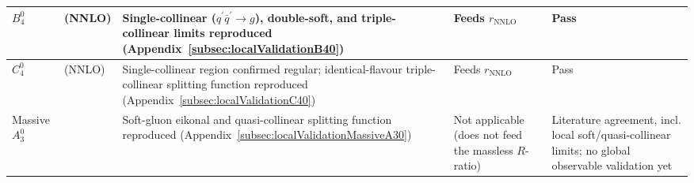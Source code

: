 \begin{center}
\begin{longtable}{|p{1.9cm}|p{2.8cm}|p{3.2cm}|p{2.4cm}|p{3.3cm}|}
$B_4^0$ & \cite{Gehrmann-DeRidder:2005btv} (NNLO) & Single-collinear ($q^\prime\bar q^\prime\to g$), double-soft, and triple-collinear limits reproduced (Appendix~\ref{subsec:localValidationB40}) & Feeds $r_\text{NNLO}$ & Pass \\ \hline
$C_4^0$ & \cite{Gehrmann-DeRidder:2005btv} (NNLO) & Single-collinear region confirmed regular; identical-flavour triple-collinear splitting function reproduced (Appendix~\ref{subsec:localValidationC40}) & Feeds $r_\text{NNLO}$ & Pass \\ \hline
Massive $A_3^0$ & \cite{GehrmannDeRidder:2009fz} & Soft-gluon eikonal and quasi-collinear splitting function reproduced (Appendix~\ref{subsec:localValidationMassiveA30}) & Not applicable (does not feed the massless $R$-ratio) & Literature agreement, incl. local soft/quasi-collinear limits; no global observable validation yet \\ \hline
\end{longtable}

\end{center}
